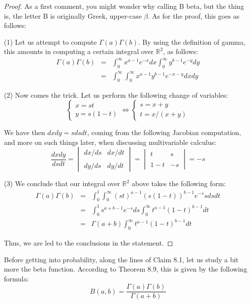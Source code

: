 \documentclass[12pt]{amsbook}
\begin{document}
\begin{proof}
As a first comment, you might wonder why calling B beta, but the thing is, the letter B is originally Greek, upper-case $\beta$. As for the proof, this goes as follows:

\medskip

(1) Let us attempt to compute $\Gamma(a)\Gamma(b)$. By using the definition of gamma, this amounts in computing a certain integral over $\mathbb R^2$, as follows:
\begin{eqnarray*}
\Gamma(a)\Gamma(b)
&=&\int_0^\infty x^{a-1}e^{-x}dx\int_0^\infty y^{b-1}e^{-y}dy\\
&=&\int_0^\infty\int_0^\infty x^{a-1}y^{b-1}e^{-x-y}dxdy
\end{eqnarray*}

(2) Now comes the trick. Let us perform the following change of variables:
$$\begin{cases}x=st\\ y=s(1-t)\end{cases}\iff
\begin{cases}s=x+y\\ t=x/(x+y)\end{cases}$$ 

We have then $dxdy=sdsdt$, coming from the following Jacobian computation, and more on such things later, when discussing multivariable calculus:
$$\frac{dxdy}{dsdt}
=\begin{vmatrix}dx/ds&dx/dt\\ \\ dy/ds&dy/dt\end{vmatrix}
=\begin{vmatrix}t&s\\ \\1-t&-s\end{vmatrix}=-s$$

(3) We conclude that our integral over $\mathbb R^2$ above takes the following form:
\begin{eqnarray*}
\Gamma(a)\Gamma(b)
&=&\int_0^1\int_0^\infty(st)^{a-1}(s(1-t))^{b-1}e^{-s}sdsdt\\
&=&\int_0^1s^{a+b-1}e^{-s}ds\int_0^\infty t^{a-1}(1-t)^{b-1}dt\\
&=&\Gamma(a+b)\int_0^\infty t^{a-1}(1-t)^{b-1}dt
\end{eqnarray*}

Thus, we are led to the conclusions in the statement.
\end{proof}

Before getting into probability, along the lines of Claim 8.1, let us study a bit more the beta function. According to Theorem 8.9, this is given by the following formula:
$$B(a,b)=\frac{\Gamma(a)\Gamma(b)}{\Gamma(a+b)}$$
\end{document}
